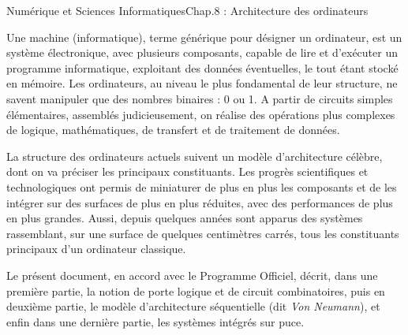 \documentclass[11pt,a4paper,french,twoside]{PMCours}
\begin{document}
{Numérique et Sciences Informatiques}{Chap.8 : Architecture des ordinateurs}

% 
% 
% 



Une machine (informatique), terme générique pour désigner un ordinateur, est un système électronique, avec plusieurs composants, capable de lire et d'exécuter un programme informatique, exploitant des données éventuelles, le tout étant stocké en mémoire. Les ordinateurs, au niveau le plus fondamental de leur structure, ne savent manipuler que des nombres binaires : 0 ou 1. A partir de circuits simples élémentaires, assemblés judicieusement, on réalise des opérations plus complexes de logique, mathématiques, de transfert et de traitement de données. 

La structure des ordinateurs actuels suivent un modèle d'architecture célèbre, dont on va préciser les principaux constituants. Les progrès scientifiques et technologiques ont permis de miniaturer de plus en plus les composants et de les intégrer sur des surfaces de plus en plus réduites, avec des performances de plus en plus grandes. Aussi, depuis quelques années sont apparus des systèmes rassemblant, sur une surface de quelques centimètres carrés, tous les constituants principaux d'un ordinateur classique. 

Le présent document, en accord avec le Programme Officiel, décrit, dans une première partie, la notion de porte logique et de circuit combinatoires, puis en deuxième partie, le modèle d'architecture séquentielle (dit \emph{Von Neumann}), et enfin dans une dernière partie, les systèmes intégrés sur puce.
\end{document}
